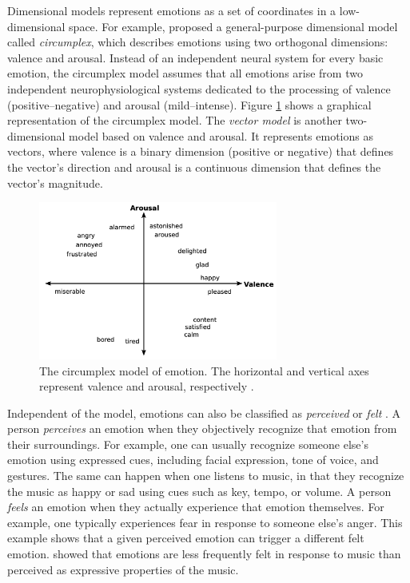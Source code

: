 Dimensional models represent emotions as a set of coordinates in a low-dimensional space. For example, \citet{russell1980circumplex} proposed a general-purpose dimensional model called \textit{circumplex}, which describes emotions using two orthogonal dimensions: valence and arousal. Instead of an independent neural system for every basic emotion, the circumplex model assumes that all emotions arise from two independent neurophysiological systems dedicated to the processing of valence (positive--negative) and arousal (mild--intense). Figure \ref{fig:circumplex} shows a graphical representation of the circumplex model. The \textit{vector model} \cite{bradley1992remembering} is another two-dimensional model based on valence and arousal. It represents emotions as vectors, where valence is a binary dimension (positive or negative) that defines the vector's direction and arousal is a continuous dimension that defines the vector's magnitude.

\begin{figure}[!h]
\centering
\includegraphics[width=0.7\textwidth]{imgs/related_work/circumplex.png}
\caption{The circumplex model of emotion. The horizontal and vertical axes represent valence and arousal,
respectively \cite{russell1980circumplex}.}
\label{fig:circumplex}
\end{figure}

Independent of the model, emotions can also be classified as \textit{perceived} or \textit{felt} \cite{gabrielsson2001emotion}. A person \textit{perceives} an emotion when they objectively recognize that emotion from their surroundings. For example, one can usually recognize someone else's emotion using expressed cues, including facial expression, tone of voice, and gestures. The same can happen when one listens to music, in that they recognize the music as happy or sad using cues such as key, tempo, or volume. A person \textit{feels} an emotion when they actually experience that emotion themselves. For example, one typically experiences fear in response to someone else's anger. This example shows that a given perceived emotion can trigger a different felt emotion. \citet{zentner2008emotions} showed that emotions are less frequently felt in response to music than perceived as expressive properties of the music.

